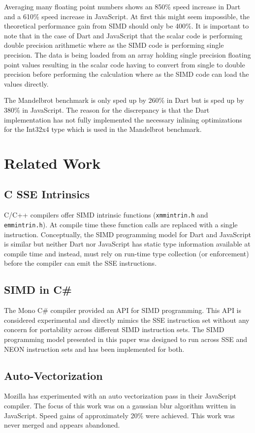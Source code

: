 \documentclass[preprint]{sigplanconf}
\begin{document}
Averaging many floating point numbers shows an 850\% speed increase in Dart and a 610\% speed increase in JavaScript. At first this might seem impossible, the theoretical performance gain from SIMD should only be 400\%. It is important to note that in the case of Dart and JavaScript that the scalar code is performing double precision arithmetic where as the SIMD code is performing single precision. The data is being loaded from an array holding single precision floating point values resulting in the scalar code having to convert from single to double precision before performing the calculation where as the SIMD code can load the values directly.

The Mandelbrot benchmark is only sped up by 260\% in Dart but is sped up by 380\% in JavaScript. The reason for the discrepancy is that the Dart implementation has not fully implemented the necessary inlining optimizations for the Int32x4 type which is used in the Mandelbrot benchmark. 

\section{Related Work}
\subsection{C SSE Intrinsics}
C/C++ compilers offer SIMD intrinsic functions (\verb!xmmintrin.h! and \verb!emmintrin.h!). At compile time these function calls are replaced with a single instruction. Conceptually, the SIMD programming model for Dart and JavaScript is similar but neither Dart nor JavaScript has static type information available at compile time and instead, must rely on run-time type collection (or enforcement) before the compiler can emit the SSE instructions.
\subsection{SIMD in C\#}
The Mono C\# compiler provided an API for SIMD\cite{monosimd} programming. This API is considered experimental and directly mimics the SSE instruction set without any concern for portability across different SIMD instruction sets. The SIMD programming model presented in this paper was designed to run across SSE and NEON instruction sets and has been implemented for both.
\subsection{Auto-Vectorization}
Mozilla has experimented\cite{mozillasimd} with an auto vectorization pass in their JavaScript compiler. The focus of this work was on a gaussian blur algorithm written in JavaScript. Speed gains of approximately 20\% were achieved. This work was never merged and appears abandoned.
\end{document}
